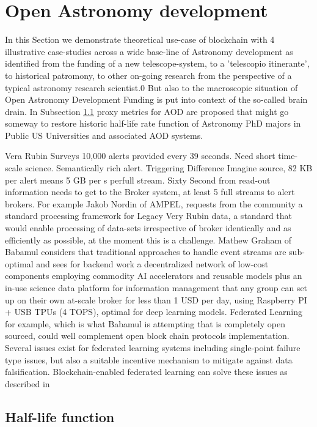\documentclass[final,5p,times,twocolumn,authoryear]{elsarticle}
\begin{document}
\section{Open Astronomy development}
\label{sec:btc2}

In this Section we demonstrate theoretical use-case of blockchain with 4 illustrative case-studies across a wide base-line of Astronomy development as identified from the funding of a new telescope-system, to a 'telescopio itinerante', to historical patromony, to other on-going research from the perspective of a typical astronomy research scientist.0 But also to the macroscopic situation of Open Astronomy Development Funding is put into context of the so-called brain drain. In Subsection \ref{btc2:sec:sub:half} proxy metrics for AOD are proposed that might go someway to restore historic half-life rate function of Astronomy PhD majors in Public US Universities and associated AOD systems. 

Vera Rubin Surveys 10,000 alerts provided every 39 seconds. Need short time-scale science. Semantically rich alert. Triggering Difference Imagine source, 82 KB per alert means 5 GB per s perfull stream. Sixty Second from read-out information needs to get to the Broker system, at least 5 full streams to alert brokers.   For example  Jakob Nordin of AMPEL, requests from the community a standard processing framework for Legacy Very Rubin data, a standard that would enable processing of data-sets irrespective of broker identically and as efficiently as possible, at the moment this is a challenge.  Mathew Graham of Babamul considers that traditional approaches to handle event streams are sub-optimal and sees for backend work a decentralized network of low-cost components employing commodity AI accelerators and reusable models plus an in-use science data platform for information management that any group can set up on their own at-scale broker for less than 1 USD per day, using Raspberry PI + USB TPUs (4 TOPS), optimal for deep learning models.  Federated Learning for example, which is what Babamul is attempting that is completely open sourced, could well complement open block chain protocols implementation. Several issues exist for federated learning systems including single-point failure type issues, but also a suitable incentive mechanism to mitigate against data falsification. Blockchain-enabled federated learning can solve these issues as described in 


\subsection{Half-life function}
\label{btc2:sec:sub:half}
\end{document}
